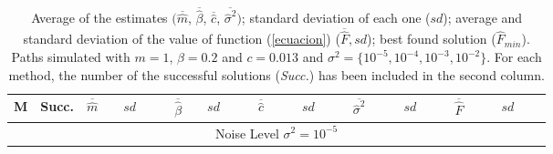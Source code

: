\documentclass{sig-alternate}
\begin{document}
\begin{table*}
\caption{\footnotesize{Average of the estimates $(\overline{\hat{m}}$, $\overline{\hat{\beta}}$, $\overline{\hat{c}}$, $\overline{\hat{\sigma}^{2}})$; standard deviation of each one ($sd$); average and standard deviation of the value of function (\ref{ecuacion}) ($\overline{\hat{F}},sd$); best found solution (${\hat{F}}_{min}$). Paths simulated with $m=1$, $\beta=0.2$ and $c=0.013$ and $\sigma^2=\{10^{-5},10^{-4},10^{-3},10^{-2}\}$. For each method, the number of the successful solutions (\emph{Succ.}) has been included in the second column.}}
\begin{center}
{\scriptsize
\begin{tabular}{lc|rrrrrrrrrr}
   M & Succ.  & $\overline{\hat{m}}\quad$&$sd\qquad$ &  $\overline{\hat{\beta}}\quad$ &$sd\qquad$ &  $\overline{\hat{c}}\qquad$ &$sd\qquad$ &  $\overline{\hat{\sigma}^{2}}\quad\quad$ &$sd\qquad$& $\overline{\hat{F}}\qquad$  &$sd\qquad$ \\
\hline
\multicolumn{12}{c}{Noise Level $\sigma^2=10^{-5}$} \\


\end{tabular}}
\end{center}
\end{table*}
\end{document}
